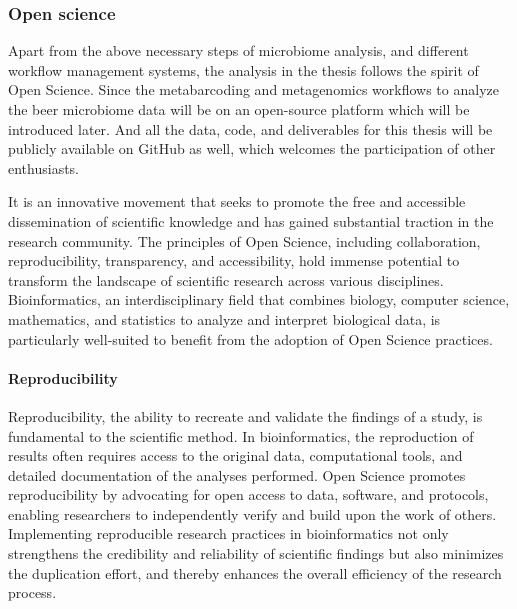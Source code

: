         \subsubsection{Open science}
            Apart from the above necessary steps of microbiome analysis, and different workflow management systems, the analysis in the thesis follows the spirit of Open Science. Since the metabarcoding and metagenomics workflows to analyze the beer microbiome data will be on an open-source platform which will be introduced later. And all the data, code, and deliverables for this thesis will be publicly available on GitHub as well, which welcomes the participation of other enthusiasts. 
            
            It is an innovative movement that seeks to promote the free and accessible dissemination of scientific knowledge and has gained substantial traction in the research community\cite{vicente2018open}. The principles of Open Science, including collaboration, reproducibility, transparency, and accessibility, hold immense potential to transform the landscape of scientific research across various disciplines. Bioinformatics, an interdisciplinary field that combines biology, computer science, mathematics, and statistics to analyze and interpret biological data, is particularly well-suited to benefit from the adoption of Open Science practices.
            
        \paragraph*{Reproducibility}
            Reproducibility, the ability to recreate and validate the findings of a study, is fundamental to the scientific method. In bioinformatics, the reproduction of results often requires access to the original data, computational tools, and detailed documentation of the analyses performed. Open Science promotes reproducibility by advocating for open access to data, software, and protocols, enabling researchers to independently verify and build upon the work of others. Implementing reproducible research practices in bioinformatics not only strengthens the credibility and reliability of scientific findings but also minimizes the duplication effort, and thereby enhances the overall efficiency of the research process.
            
